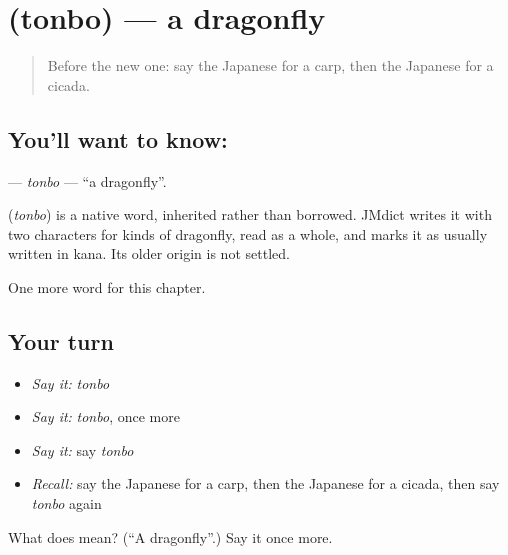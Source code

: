 \section[\texorpdfstring{\ja{とんぼ} (tonbo)}{とんぼ (tonbo)}]{ (tonbo) — a dragonfly}

\label{lesson:JA-C65-tonbo}



\begin{quote}
Before the new one: say the Japanese for a carp, then the Japanese for a cicada.
\end{quote}

\subsection*{You'll want to know: }
\textbf{} — \emph{tonbo} — \textquotedblleft{}a dragonfly\textquotedblright{}.

\begin{cousinweb}
\textbf{} (\emph{tonbo}) is a native word, inherited rather than borrowed. JMdict writes it with two characters for kinds of dragonfly, read as a whole, and marks it as usually written in kana. Its older origin is not settled.
\end{cousinweb}

\begin{grammarlens}[title={What you've built}]
One more word for this chapter.
\end{grammarlens}

\subsection*{Your turn}
\begin{itemize}
\raggedright
  \item \emph{Say it:} \emph{tonbo}
  \item \emph{Say it:} \emph{tonbo}, once more
  \item \emph{Say it:} say \emph{tonbo}
  \item \emph{Recall:} say the Japanese for a carp, then the Japanese for a cicada, then say \emph{tonbo} again
\end{itemize}

\begin{tcolorbox}[breakable,colback=teal!4,colframe=teal!35!black,title={Before you move on}]
What does  mean? (\textquotedblleft{}A dragonfly\textquotedblright{}.) Say it once more.
\end{tcolorbox}
